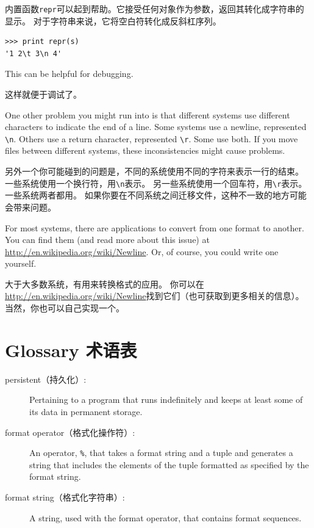 \documentclass[10pt]{book}
\begin{document}
\begin{CJK}{UTF8}{gbsn}
内置函数{\tt repr}可以起到帮助。它接受任何对象作为参数，返回其转化成字符串的显示。
对于字符串来说，它将空白符转化成反斜杠序列。

\begin{verbatim}
>>> print repr(s)
'1 2\t 3\n 4'
\end{verbatim}

This can be helpful for debugging.

这样就便于调试了。

One other problem you might run into is that different systems
use different characters to indicate the end of a line.  Some
systems use a newline, represented \verb"\n".  Others use
a return character, represented \verb"\r".  Some use both.
If you move files between different systems, these inconsistencies
might cause problems.

另外一个你可能碰到的问题是，不同的系统使用不同的字符来表示一行的结束。
一些系统使用一个换行符，用\verb"\n"表示。
另一些系统使用一个回车符，用\verb"\r"表示。
一些系统两者都用。
如果你要在不同系统之间迁移文件，这种不一致的地方可能会带来问题。

For most systems, there are applications to convert from one
format to another.  You can find them (and read more about this
issue) at \url{http://en.wikipedia.org/wiki/Newline}.  Or, of course, you
could write one yourself.

大于大多数系统，有用来转换格式的应用。
你可以在\url{http://en.wikipedia.org/wiki/Newline}找到它们（也可获取到更多相关的信息）。
当然，你也可以自己实现一个。

\section{Glossary 术语表}

\begin{description}

\item[persistent（持久化）:] Pertaining to a program that runs indefinitely
and keeps at least some of its data in permanent storage.

\item[format operator（格式化操作符）:] An operator, {\tt \%}, that takes a format
string and a tuple and generates a string that includes
the elements of the tuple formatted as specified by the format string.

\item[format string（格式化字符串）:] A string, used with the format operator, that
contains format sequences.  


\end{description}
\end{CJK}
\end{document}
